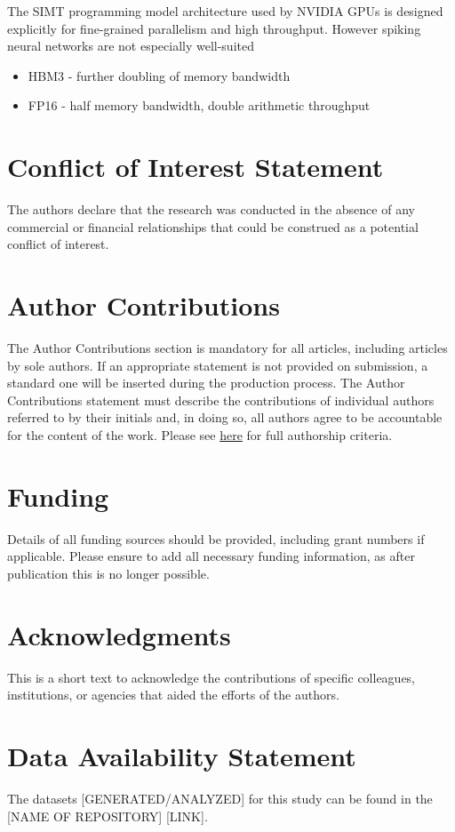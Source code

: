 \documentclass[utf8]{frontiersSCNS} %
\begin{document}
The SIMT programming model architecture used by NVIDIA GPUs is designed explicitly for fine-grained parallelism and high throughput.
However spiking neural networks are not especially well-suited

\begin{itemize}
    \item HBM3 - further doubling of memory bandwidth
    \item FP16 - half memory bandwidth, double arithmetic throughput
\end{itemize}

\section*{Conflict of Interest Statement}
The authors declare that the research was conducted in the absence of any commercial or financial relationships that could be construed as a potential conflict of interest.

\section*{Author Contributions}
The Author Contributions section is mandatory for all articles, including articles by sole authors. If an appropriate statement is not provided on submission, a standard one will be inserted during the production process. The Author Contributions statement must describe the contributions of individual authors referred to by their initials and, in doing so, all authors agree to be accountable for the content of the work. Please see  \href{http://home.frontiersin.org/about/author-guidelines#AuthorandContributors}{here} for full authorship criteria.

\section*{Funding}
Details of all funding sources should be provided, including grant numbers if applicable. Please ensure to add all necessary funding information, as after publication this is no longer possible.

\section*{Acknowledgments}
This is a short text to acknowledge the contributions of specific colleagues, institutions, or agencies that aided the efforts of the authors.

\section*{Data Availability Statement}
The datasets [GENERATED/ANALYZED] for this study can be found in the [NAME OF REPOSITORY] [LINK].
%



\end{document}
